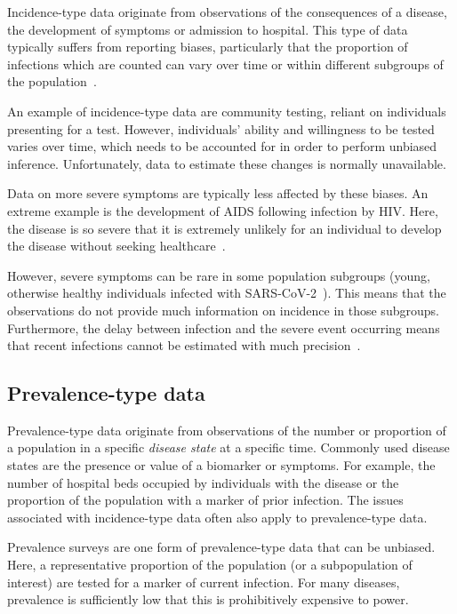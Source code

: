 \documentclass[thesis.tex]{subfiles}
\begin{document}
Incidence-type data originate from observations of the consequences of a disease, \eg the development of symptoms or admission to hospital.
This type of data typically suffers from reporting biases, particularly that the proportion of infections which are counted can vary over time or within different subgroups of the population~\autocites[chapter 9]{lashModern}{shadboltChallenges}.

An example of incidence-type data are community testing, reliant on individuals presenting for a test.
However, individuals' ability and willingness to be tested varies over time, which needs to be accounted for in order to perform unbiased inference.
Unfortunately, data to estimate these changes is normally unavailable.

Data on more severe symptoms are typically less affected by these biases.
An extreme example is the development of AIDS following infection by HIV.
Here, the disease is so severe that it is extremely unlikely for an individual to develop the disease without seeking healthcare~\autocite{evansCompleteness}.

However, severe symptoms can be rare in some population subgroups (\eg young, otherwise healthy individuals infected with SARS-CoV-2~\autocite{wardSero,bhopalChildren}).
This means that the observations do not provide much information on incidence in those subgroups.
Furthermore, the delay between infection and the severe event occurring means that recent infections cannot be estimated with much precision~\autocite{swallow2022challenges}.

\subsection{Prevalence-type data}

Prevalence-type data originate from observations of the number or proportion of a population in a specific \emph{disease state} at a specific time.
Commonly used disease states are the presence or value of a biomarker or symptoms.
For example, the number of hospital beds occupied by individuals with the disease or the proportion of the population with a marker of prior infection.
The issues associated with incidence-type data often also apply to prevalence-type data.

Prevalence surveys are one form of prevalence-type data that can be unbiased.
Here, a representative proportion of the population (or a subpopulation of interest) are tested for a marker of current infection.
For many diseases, prevalence is sufficiently low that this is prohibitively expensive to power.
\end{document}
